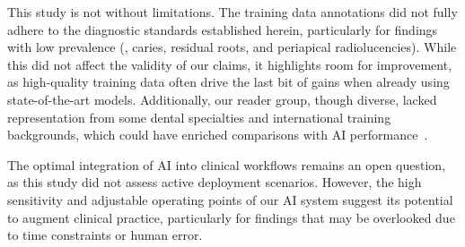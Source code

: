 

This study is not without limitations.
The training data annotations did not fully adhere to the diagnostic standards established herein, particularly for findings with low prevalence (\eg, caries, residual roots, and periapical radiolucencies).
While this did not affect the validity of our claims, it highlights room for improvement, as high-quality training data often drive the last bit of gains when already using state-of-the-art models.
Additionally, our reader group, though diverse, lacked representation from some dental specialties and international training backgrounds, which could have enriched comparisons with AI performance~\citep{endres2020development}.


The optimal integration of AI into clinical workflows remains an open question, as this study did not assess active deployment scenarios.
However, the high sensitivity and adjustable operating points of our AI system suggest its potential to augment clinical practice, particularly for findings that may be overlooked due to time constraints or human error.

